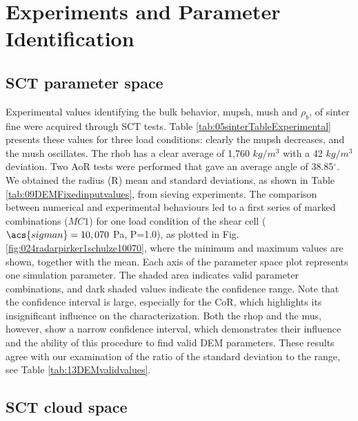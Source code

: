 
\section{Experiments and Parameter Identification}
\label{sec:experimentsparameteridentification}



\subsection{SCT parameter space}
\label{subsec:sctparameterspace}

Experimental values identifying the bulk behavior, \acs{mupsh}, \acs{mush} and $\rho_{b}$, 
of sinter fine were acquired through \acs{SCT} tests. 
Table \ref{tab:05sinterTableExperimental} presents
these values for three load conditions: clearly the \acs{mupsh} decreases, and 
the \acs{mush} oscillates.
The \acs{rhob} has a clear average of 1,760 $kg/m^3$ with a 42 
$kg/m^3$ deviation.
Two \acs{AoR} tests were performed that gave an average angle of
38.85$^\circ$.
We obtained the radius (\acs{R}) mean and standard
deviations, as shown in Table
\ref{tab:09DEMFixedinputvalues}, from sieving experiments.
The comparison between numerical and experimental behaviours led to a first
series of marked combinations ($MC1$) for one load condition of
the shear cell ($\acs{sigman} = 10,070$ Pa, P=1.0), as plotted in Fig.
\ref{fig:024radarpirker1schulze10070}, where 
the minimum and maximum values are shown, together with the mean. 
Each axis of the parameter space plot represents one simulation parameter.
The shaded area indicates valid parameter combinations, and dark shaded
values indicate the confidence range.
Note that the confidence interval is large, 
especially for the \acs{CoR}, which highlights its insignificant influence on the
characterization.
Both the \acs{rhop}  and the \acs{mus}, however, show a narrow confidence interval, 
which demonstrates their influence and the ability of this procedure to find
valid \acs{DEM} parameters.
These results agree with our examination of the ratio of the standard deviation
to the range, see Table \ref{tab:13DEMvalidvalues}.

\subsection{SCT cloud space}
\label{subsec:sctcloudspace}

